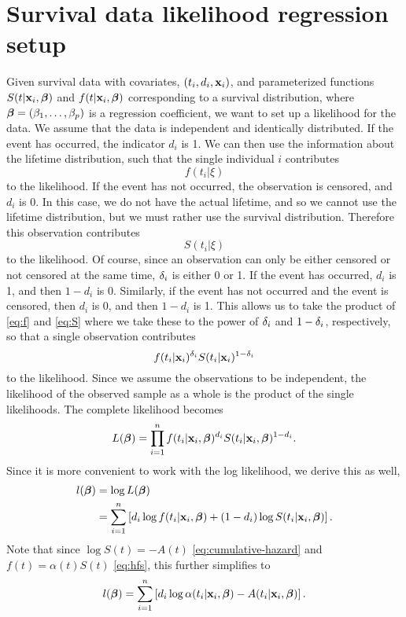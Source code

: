 \section{Survival data likelihood regression setup}
Given survival data with covariates, $(t_i,d_i,\mathbf{x}_i)$, and parameterized functions $S(t|\mathbf{x}_i,\boldsymbol{\beta})$ and $f(t|\mathbf{x}_i,\boldsymbol{\beta})$ corresponding to a survival distribution, where $\boldsymbol{\beta}=(\beta_1,\ldots,\beta_p)$ is a regression coefficient, we want to set up a likelihood for the data. We assume that the data is independent and identically distributed. If the event has occurred, the indicator $d_i$ is 1. We can then use the information about the lifetime distribution, such that the single individual $i$ contributes
\begin{equation}\label{eq:f}
    f(t_i|\xi)
\end{equation}
to the likelihood. If the event has not occurred, the observation is censored, and $d_i$ is 0. In this case, we do not have the actual lifetime, and so we cannot use the lifetime distribution, but we must rather use the survival distribution. Therefore this observation contributes
\begin{equation}\label{eq:S}
    S(t_i|\xi)
\end{equation}
to the likelihood. Of course, since an observation can only be either censored or not censored at the same time, $\delta_{i}$ is either 0 or 1. If the event has occurred, $d_i$ is 1, and then $1-d_i$ is 0. Similarly, if the event has not occurred and the event is censored, then $d_i$
 is 0, and then $1-d_i$ is 1. This allows us to take the product of \eqref{eq:f} and \eqref{eq:S} where we take these to the power of $\delta_{i}$ and $1-\delta_{i}$, respectively, so that a single observation contributes
\begin{equation*}
    f(t_{i}|\mathbf{x}_i)^{\delta_{i}}S(t_{i}|\mathbf{x}_i)^{1-\delta_{i}}
\end{equation*}
to the likelihood. Since we assume the observations to be independent, the likelihood of the observed sample as a whole is the product of the single likelihoods. The complete likelihood becomes
\begin{equation}\label{eq:surv-lik}
    L(\boldsymbol{\beta})=\prod_{i=1}^n f(t_i|\mathbf{x}_i,\boldsymbol{\beta})^{d_i} S(t_i|\mathbf{x}_i,\boldsymbol{\beta})^{1-d_i}.
\end{equation}
Since it is more convenient to work with the log likelihood, we derive this as well,
\begin{align}\label{eq:surv-lik}
\begin{split}
    l(\boldsymbol{\beta})&=\log L(\boldsymbol{\beta}) \\
    &=\sum_{i=1}^n\left[ d_i \log f(t_i|\mathbf{x}_i,\boldsymbol{\beta}) + (1-d_i)\log S(t_i|\mathbf{x}_i,\boldsymbol{\beta})\right].
\end{split}
\end{align}
Note that since $\log S(t)=-A(t)$ \eqref{eq:cumulative-hazard} and $f(t)=\alpha(t)S(t)$ \eqref{eq:hfs}, this further simplifies to
\begin{equation*}
    l(\boldsymbol{\beta})=\sum_{i=1}^n\left[ d_i \log \alpha(t_i|\mathbf{x}_i,\boldsymbol{\beta}) - A(t_i|\mathbf{x}_i,\boldsymbol{\beta})\right].
\end{equation*}

